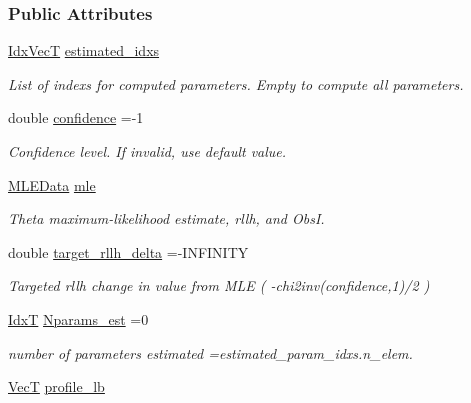 \subsubsection*{Public Attributes}
\begin{DoxyCompactItemize}
\item 
\hyperlink{namespacemappel_ac63743dcd42180127307cd0e4ecdd784}{Idx\+VecT} \hyperlink{structmappel_1_1estimator_1_1ProfileBoundsData_a04704405afc4353671f67cee0f221f6b}{estimated\+\_\+idxs}
\begin{DoxyCompactList}\small\item\em List of indexs for computed parameters. Empty to compute all parameters. \end{DoxyCompactList}\item 
double \hyperlink{structmappel_1_1estimator_1_1ProfileBoundsData_a7c56b494bd5c2af6fcf6f8b40416a203}{confidence} =-\/1
\begin{DoxyCompactList}\small\item\em Confidence level. If invalid, use default value. \end{DoxyCompactList}\item 
\hyperlink{namespacemappel_1_1estimator_structmappel_1_1estimator_1_1MLEData}{M\+L\+E\+Data} \hyperlink{structmappel_1_1estimator_1_1ProfileBoundsData_a719ed1845a32b5e7af3f7e2fdd18149d}{mle}
\begin{DoxyCompactList}\small\item\em Theta maximum-\/likelihood estimate, rllh, and ObsI. \end{DoxyCompactList}\item 
double \hyperlink{structmappel_1_1estimator_1_1ProfileBoundsData_a524173c1125ec843b904feb119fb182b}{target\+\_\+rllh\+\_\+delta} =-\/I\+N\+F\+I\+N\+I\+TY
\begin{DoxyCompactList}\small\item\em Targeted rllh change in value from M\+LE ( -\/chi2inv(confidence,1)/2 ) \end{DoxyCompactList}\item 
\hyperlink{namespacemappel_ab17ec0f30b61ece292439d7ece81d3a8}{IdxT} \hyperlink{structmappel_1_1estimator_1_1ProfileBoundsData_a5dd4b18893235445bca9608d5746c6c2}{Nparams\+\_\+est} =0
\begin{DoxyCompactList}\small\item\em number of parameters estimated =estimated\+\_\+param\+\_\+idxs.\+n\+\_\+elem. \end{DoxyCompactList}\item 
\hyperlink{namespacemappel_a2225ad69f358daa3f4f99282a35b9a3a}{VecT} \hyperlink{structmappel_1_1estimator_1_1ProfileBoundsData_a0bc6ca65076892186f02bea98aa88268}{profile\+\_\+lb}

\end{DoxyCompactItemize}
